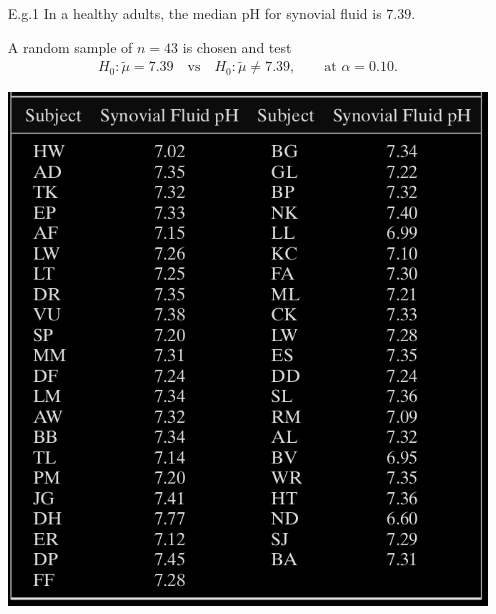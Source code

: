 \begin{frame}[fragile]
\begin{itemize}
	\item[E.g.1] In a healthy adults, the median pH for synovial fluid is $7.39$.
	\item[] A random sample of $n=43$ is chosen and test
		\begin{align*}
			H_0: \widetilde{\mu}=7.39\quad\text{vs}\quad
			H_0: \widetilde{\mu}\ne 7.39,\qquad \text{at $\alpha=0.10$.}
		\end{align*}
		\begin{center}
			\includegraphics[scale=0.25]{./Codes/Table14-2-1.png}
		\end{center}
\end{itemize}
\end{frame}
